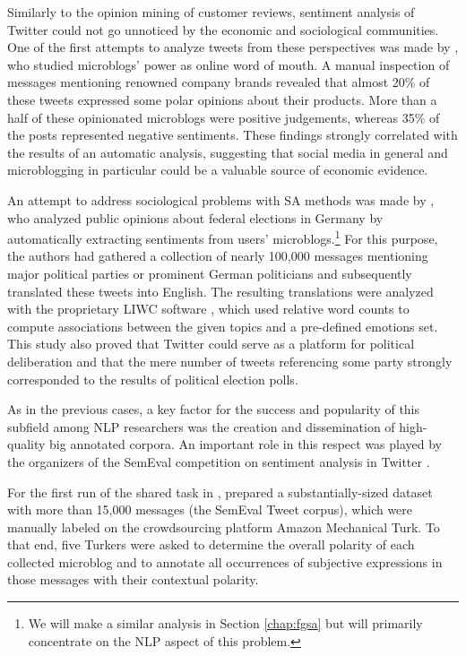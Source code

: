 Similarly to the opinion mining of customer reviews, sentiment
analysis of Twitter could not go unnoticed by the economic and
sociological communities.  One of the first attempts to analyze tweets
from these perspectives was made by \citet{Jansen:09}, who studied
microblogs' power as online word of mouth.  A manual inspection of
messages mentioning renowned company brands revealed that almost 20\%
of these tweets expressed some polar opinions about their products.
More than a half of these opinionated microblogs were positive
judgements, whereas 35\% of the posts represented negative sentiments.
These findings strongly correlated with the results of an automatic
analysis, suggesting that social media in general and microblogging in
particular could be a valuable source of economic evidence.

An attempt to address sociological problems with SA methods was made
by \citet{Tumasjan:10}, who analyzed public opinions about federal
elections in Germany by automatically extracting sentiments from
users' microblogs.\footnote{We will make a similar analysis in Section
  \ref{chap:fgsa} but will primarily concentrate on the NLP aspect of
  this problem.}  For this purpose, the authors had gathered a
collection of nearly 100,000 messages mentioning major political
parties or prominent German politicians and subsequently translated
these tweets into English.  The resulting translations were analyzed
with the proprietary LIWC software \cite{Pannebaker:07}, which used
relative word counts to compute associations between the given topics
and a pre-defined emotions set.  This study also proved that Twitter
could serve as a platform for political deliberation and that the mere
number of tweets referencing some party strongly corresponded to the
results of political election polls.

As in the previous cases, a key factor for the success and popularity
of this subfield among NLP researchers was the creation and
dissemination of high-quality big annotated corpora.  An important
role in this respect was played by the organizers of the SemEval
competition on sentiment analysis in Twitter
\cite{Nakov:13,Rosenthal:14,Rosenthal:15}.

For the first run of the shared task in \citeyear{Nakov:13},
\citet{Nakov:13} prepared a substantially-sized dataset with more than
15,000 messages (the SemEval Tweet corpus), which were manually
labeled on the crowdsourcing platform Amazon Mechanical Turk.  To that
end, five Turkers were asked to determine the overall polarity of each
collected microblog and to annotate all occurrences of subjective
expressions in those messages with their contextual polarity.

